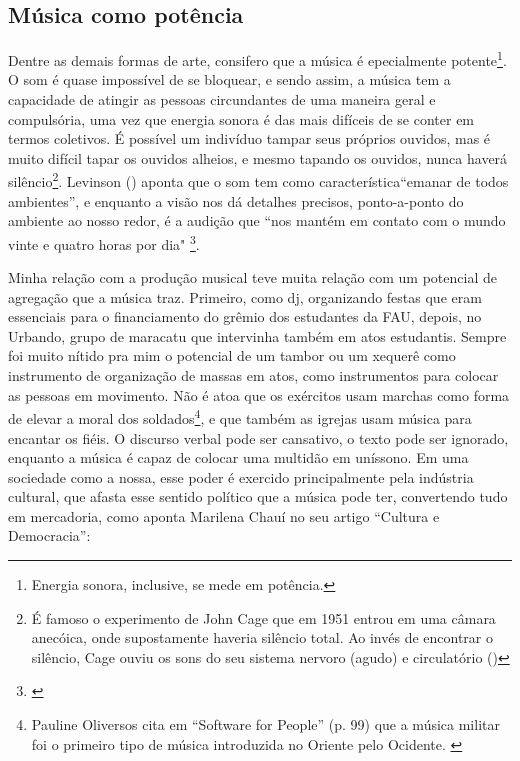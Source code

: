 \subsection{Música como potência}
Dentre as demais formas de arte, consifero que a música é epecialmente potente\footnote{Energia sonora, inclusive, se mede em potência.}. O som é quase impossível de se bloquear, e sendo assim, a música tem a capacidade de atingir as pessoas circundantes de uma maneira geral e compulsória, uma vez que energia sonora é das mais difíceis de se conter em termos coletivos. É possível um indivíduo tampar seus próprios ouvidos, mas é muito difícil tapar os ouvidos alheios, e mesmo tapando os ouvidos, nunca haverá silêncio\footnote{É famoso o experimento de John Cage que em 1951 entrou em uma câmara anecóica, onde supostamente haveria silêncio total. Ao invés de encontrar o silêncio, Cage ouviu os sons do seu sistema nervoro (agudo) e circulatório (\cite{Mauceri1997})}. Levinson (\citeyear{Levinson2001}) aponta que o som tem como característica``emanar de todos ambientes'', e enquanto a visão nos dá detalhes precisos, ponto-a-ponto do ambiente ao nosso redor, é a audição que ``nos mantém em contato com o mundo vinte e quatro horas por dia" \footnote{\cite[47]{Levinson2001}}.  


 

Minha relação com a produção musical teve muita relação com um potencial de agregação que a música traz. Primeiro, como dj, organizando festas que eram essenciais para o financiamento do grêmio dos estudantes da FAU, depois, no Urbando, grupo de maracatu que intervinha também em atos estudantis. Sempre foi muito nítido pra mim o potencial de um tambor ou um xequerê como instrumento de organização de massas em atos, como instrumentos para colocar as pessoas em movimento. Não é atoa que os exércitos usam marchas como forma de elevar a moral dos soldados\footnote{Pauline Oliversos cita em ``Software for People'' (p. 99) que a música militar foi o primeiro tipo de música introduzida no Oriente pelo Ocidente. \cite{Oliveros2012}}, e que também as igrejas usam música para encantar os fiéis. O discurso verbal pode ser cansativo, o texto pode ser ignorado, enquanto a música é capaz de colocar uma multidão em uníssono. Em uma sociedade como a nossa, esse poder é exercido principalmente pela indústria cultural, que afasta esse sentido político que a música pode ter, convertendo tudo em mercadoria, como aponta Marilena Chauí no seu artigo ``Cultura e Democracia'': 

